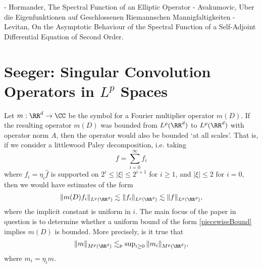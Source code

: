 \begin{itemize}
    - Hormander, The Spectral Function of an Elliptic Operator
    - Avakumovic, Uber die Eigenfunktionen auf Geschlossenen Riemannschen Mannigfaltigkeiten
    - Levitan, On the Asymptotic Behaviour of the Spectral Function of a Self-Adjoint Differential Equation of Second Order.



\end{itemize}


\chapter{Seeger: Singular Convolution Operators in $L^p$ Spaces}

Let $m: \RR^d \to \CC$ be the symbol for a Fourier multiplier operator $m(D)$. If the resulting operator $m(D)$ was bounded from $L^p(\RR^d)$ to $L^p(\RR^d)$ with operator norm $A$, then the operator would also be bounded `at all scales'. That is, if we consider a littlewood Paley decomposition, i.e. taking
%
\[ f = \sum_{i = 0}^\infty f_i \]
%
where $\widehat{f_i} = \eta_i \widehat{f}$ is supported on $2^i \leq |\xi| \leq 2^{i+1}$ for $i \geq 1$, and $|\xi| \leq 2$ for $i = 0$, then we would have estimates of the form
%
\begin{equation} \label{piecewiseBound}
    \| m(D) f_i \|_{L^p(\RR^d)} \lesssim \| f_i \|_{L^p(\RR^d)} \lesssim \| f \|_{L^p(\RR^d)},
\end{equation}
%
where the implicit constant is uniform in $i$. The main focus of the paper in question is to determine whether a uniform bound of the form \eqref{piecewiseBound} implies $m(D)$ is bounded. More precisely, is it true that
%
\begin{equation} \label{operatorbound}
    \| m \|_{M^p(\RR^d)} \lesssim_p \sup\nolimits_{i \geq 0} \| m_i \|_{M^p(\RR^d)},
\end{equation}
%
where $m_i = \eta_i m$.

